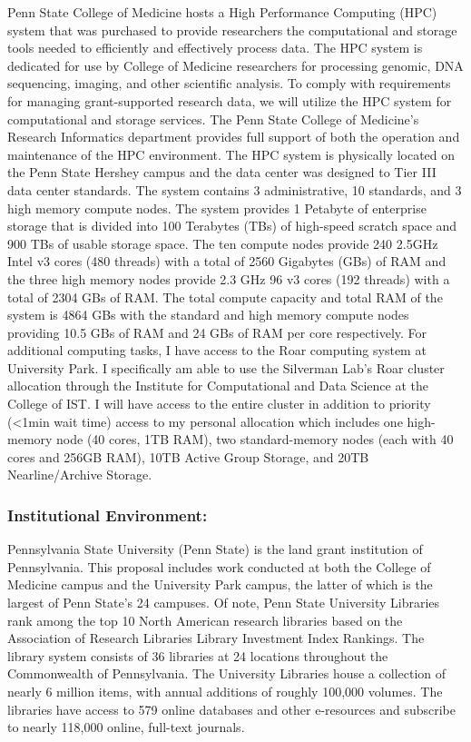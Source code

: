 \documentclass{NIHGrant}
\begin{document}
Penn State College of Medicine hosts a High Performance Computing (HPC) system that was purchased to provide researchers the computational and storage tools needed to efficiently and effectively process data. The HPC system is dedicated for use by College of Medicine researchers for processing genomic, DNA sequencing, imaging, and other scientific analysis. To comply with requirements for managing grant-supported research data, we will utilize the HPC system for computational and storage services. The Penn State College of Medicine’s Research Informatics department provides full support of both the operation and maintenance of the HPC environment. The HPC system is physically located on the Penn State Hershey campus and the data center was designed to Tier III data center standards. The system contains 3 administrative, 10 standards, and 3 high memory compute nodes. The system provides 1 Petabyte of enterprise storage that is divided into 100 Terabytes (TBs) of high-speed scratch space and 900 TBs of usable storage space. The ten compute nodes provide 240 2.5GHz Intel v3 cores (480 threads) with a total of 2560 Gigabytes (GBs) of RAM and the three high memory nodes provide 2.3 GHz 96 v3 cores (192 threads) with a total of 2304 GBs of RAM. The total compute capacity and total RAM of the system is 4864 GBs with the standard and high memory compute nodes providing 10.5 GBs of RAM and 24 GBs of RAM per core respectively. For additional computing tasks, I have access to the Roar computing system at University Park. I specifically am able to use the Silverman Lab's Roar cluster allocation through the Institute for Computational and Data Science at the College of IST. I will have access to the entire cluster in addition to priority (<1min wait time) access to my personal allocation which includes one high-memory node (40 cores, 1TB RAM),
two standard-memory nodes (each with 40 cores and 256GB RAM), 10TB Active Group Storage, and 20TB
Nearline/Archive Storage.


\subsubsection*{Institutional Environment:} Pennsylvania State University (Penn State) is the land grant institution of Pennsylvania. This proposal includes work conducted at both the College of Medicine campus and the University Park campus, the latter of which is the largest of Penn State's 24 campuses. Of note, Penn State University Libraries rank among the
top 10 North American research libraries based on the Association of Research Libraries Library Investment
Index Rankings. The library system consists of 36 libraries at 24 locations throughout the Commonwealth of
Pennsylvania. The University Libraries house a collection of nearly 6 million items, with annual additions of roughly
100,000 volumes. The libraries have access to 579 online databases and other e-resources and subscribe to
nearly 118,000 online, full-text journals.
\end{document}
